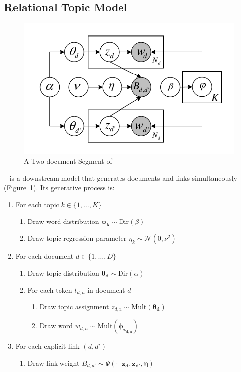 \subsection{Relational Topic Model}
\label{ssec:rtm}


\begin{figure}[t!]
  \centering
  \includegraphics[width=.8\linewidth]{2016_acl_docblock/figures/rtm.pdf}
  \caption{A Two-document Segment of \rtm}\label{fig:rtm}
\end{figure}

\rtm~\cite{chang-2010-rtm} is a downstream model that generates
documents and links simultaneously (Figure~\ref{fig:rtm}).  Its
generative process is:\par\nobreak
\begin{small}
\begin{enumerate}[leftmargin=*,noitemsep]
\item For each topic $k\in \{1,\ldots,K\}$
    \begin{enumerate}
    \item Draw word distribution $\bm{\phi_k}\sim \mathrm{Dir}(\beta)$
    \item Draw topic regression parameter $\eta_k\sim \mathcal{N}(0,\nu^2)$
    \end{enumerate}
\item For each document $d\in \{1,\ldots,D\}$
    \begin{enumerate}
    \item Draw topic distribution $\bm{\theta_d}\sim \mathrm{Dir}(\alpha)$
    \item For each token $t_{d,n}$ in document $d$
        \begin{enumerate}
        \item Draw topic assignment $z_{d,n}\sim \mathrm{Mult}(\bm{\theta_d})$
        \item Draw word $w_{d,n}\sim \mathrm{Mult}(\bm{\phi_{z_{d,n}}})$
        \end{enumerate}
    \end{enumerate}
\item For each explicit link $(d,d')$
    \begin{enumerate}
    \item Draw link weight $B_{d,d'}\sim \Psi(\cdot\,|\, \bm{z_d}, \bm{z_{d'}}, \bm{\eta})$
    \end{enumerate}
\end{enumerate}
\end{small}

